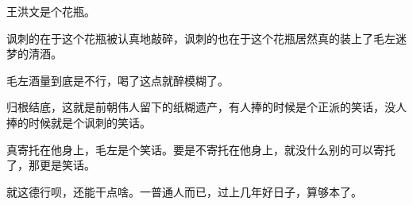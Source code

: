\begin{zhihuanswer}
王洪文是个花瓶。

讽刺的在于这个花瓶被认真地敲碎，讽刺的也在于这个花瓶居然真的装上了毛左迷梦的清酒。

毛左酒量到底是不行，喝了这点就醉模糊了。

归根结底，这就是前朝伟人留下的纸糊遗产，有人捧的时候是个正派的笑话，没人捧的时候就是个讽刺的笑话。

真寄托在他身上，毛左是个笑话。要是不寄托在他身上，就没什么别的可以寄托了，那更是笑话。

就这德行呗，还能干点啥。一普通人而已，过上几年好日子，算够本了。
\end{zhihuanswer}
